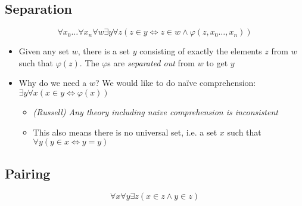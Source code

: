 \subsection{Separation}
\begin{equation*}
\forall x_0 \dots \forall x_n \forall w \exists y \forall z (z \in y \iff z \in w \land \varphi (z, x_0 \dots, x_n))
\end{equation*}

\begin{itemize}
	
	\item Given any set $ w $,  there is a set $ y $ consisting of  exactly the elements $ z $ from $ w $ such that $ \varphi(z) $. The $ \varphi $s are \textit{separated out} from $ w $ to get $ y $
		
	\item Why do we need a $ w $? We would like to do na\"ive comprehension: $ \exists y \forall x (x \in y \iff \varphi(x)) $
	
	\begin{itemize}
		
		\item \textit{(Russell) Any theory including na\"ive comprehension is inconsistent}
		
		
		\item This also means there is no universal set, i.e. a set $ x $ such that $ \forall y (y \in x \iff y = y) $
		
		
	\end{itemize}
	

	
\end{itemize}

\subsection{Pairing}
\begin{equation*}
\forall x \forall y \exists z (x \in z \land y \in z)
\end{equation*}

